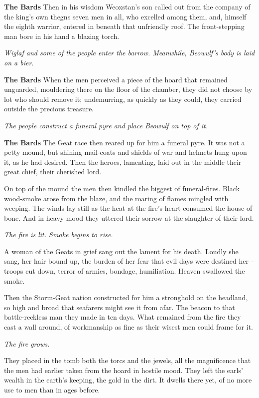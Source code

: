 \documentclass[a4paper]{article}
\begin{document}
{\textbf{The Bards} Then in his wisdom Weoxstan's son
called out from the company of the king's own thegns
seven men in all, who excelled among them,
and, himself the eighth warrior, entered in beneath
that unfriendly roof. The front-stepping man
bore in his hand a blazing torch.

\newpage
\centerline{\textit{Wiglaf and some of the people enter the barrow. Meanwhile, Beowulf's body is laid on a bier.}}

\textbf{The Bards} When the men perceived a piece of the hoard
that remained unguarded, mouldering there
on the floor of the chamber, they did not choose by lot
who should remove it; undemurring,
as quickly as they could, they carried outside
the precious treasure.

\centerline{\textit{The people construct a funeral pyre and place Beowulf on top of it.}}

\textbf{The Bards} The Geat race then reared up for him
a funeral pyre. It was not a petty mound,
but shining mail-coats and shields of war
and helmets hung upon it, as he had desired.
Then the heroes, lamenting, laid out in the middle
their great chief, their cherished lord.

On top of the mound the men then kindled
the biggest of funeral-fires. Black wood-smoke
arose from the blaze, and the roaring of flames
mingled with weeping. The winds lay still
as the heat at the fire's heart consumed
the house of bone. And in heavy mood
they uttered their sorrow at the slaughter of their lord.

\centerline{\textit{The fire is lit. Smoke begins to rise.}}

A woman of the Geats in grief sang out
the lament for his death. Loudly she sang,
her hair bound up, the burden of her fear
that evil days were destined her
– troops cut down, terror of armies,
bondage, humiliation. Heaven swallowed the smoke.

Then the Storm-Geat nation constructed for him
a stronghold on the headland, so high and broad
that seafarers might see it from afar.
The beacon to that battle-reckless man
they made in ten days. What remained from the fire
they cast a wall around, of workmanship
as fine as their wisest men could frame for it.

\centerline{\textit{The fire grows.}}

\newpage
They placed in the tomb both the torcs and the jewels,
all the magnificence that the men had earlier
taken from the hoard in hostile mood.
They left the earls' wealth in the earth's keeping,
the gold in the dirt. It dwells there yet,
of no more use to men than in ages before.

}
\end{document}
